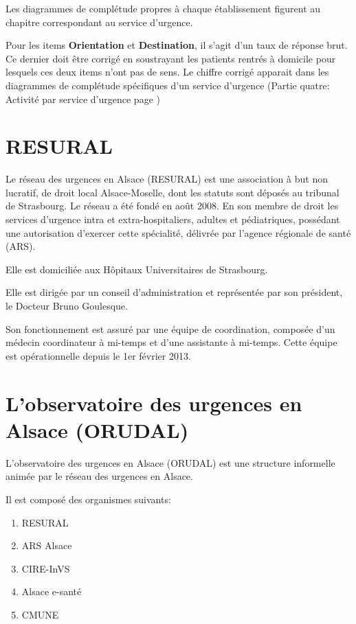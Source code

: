 \documentclass[12pt,english,french,twoside]{book}\usepackage[]{graphicx}\usepackage[]{color}
\begin{document}
Les diagrammes de complétude propres à chaque établissement figurent au chapitre correspondant au service d'urgence.

Pour les items \textbf{Orientation} et \textbf{Destination}, il s'agit d'un taux de réponse brut. Ce dernier doit être corrigé en soustrayant les patients rentrés à domicile pour lesquels ces deux items n'ont pas de sens. Le chiffre corrigé apparait dans les diagrammes de complétude spécifiques d'un service d'urgence (Partie quatre: Activité par service d'urgence page \pageref{partie4})


\newpage
\chapter{RESURAL}


Le réseau des urgences en Alsace (RESURAL) est une association à but non lucratif, de droit local Alsace-Moselle, dont les statuts sont déposés au tribunal de Strasbourg. Le réseau a été fondé en août 2008. En son membre de droit les services d'urgence intra et extra-hospitaliers, adultes et pédiatriques, possédant une autorisation d'exercer cette spécialité, délivrée par l'agence régionale de santé (ARS). 

Elle est domiciliée aux Hôpitaux Universitaires de Strasbourg.

Elle est dirigée par un conseil d'administration et représentée par son président, le Docteur Bruno Goulesque.

Son fonctionnement est assuré par une équipe de coordination, composée d'un médecin coordinateur à mi-temps et d'une assistante à mi-temps. Cette équipe est opérationnelle depuis le 1er février 2013.


\newpage
\chapter{L'observatoire des urgences en Alsace (ORUDAL)}


L'observatoire des urgences en Alsace (ORUDAL) est une structure informelle animée par le réseau des urgences en Alsace.

Il est composé des organismes suivants:
\begin{enumerate}
  \item RESURAL 
  \item ARS Alsace
  \item CIRE-InVS
  \item Alsace e-santé
  \item CMUNE
\end{enumerate}
\end{document}
